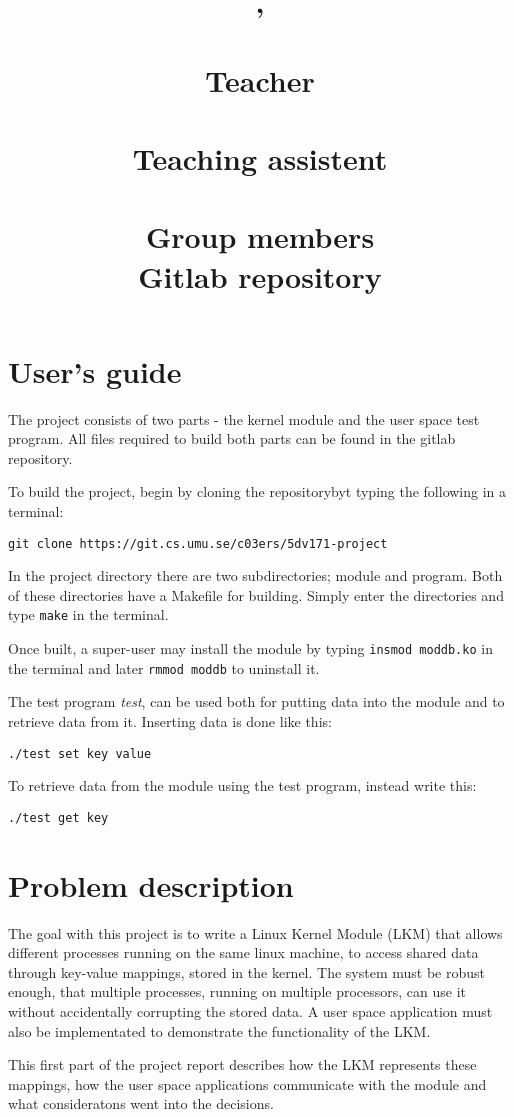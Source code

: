 \documentclass[draft,a4paper]{article}
\title{
  \vspace{4em}
  \pagenumbering{gobble}
  \begin{center}
  {\LARGE \bf \course{}, \semester}\\
  {\Large \bf \assignment}\\
  \vspace{6em}
  {\normalsize
  {\bf Teacher}\\
  {\lecturer}\vspace{1em}\\
  {\bf Teaching assistent}\\
  {\assistants}\vspace{1em}\\
  {\bf Group members}\\
  \authors
  {\bf Gitlab repository}\vspace{-1em}\\
  {\codebase}}
  \end{center}
}
\author{}
\date{}
\newcommand{\codebase}{https://git.cs.umu.se/c03ers/5dv171-project}
\begin{document}
\maketitle
\pagebreak
{}

\section*{User's guide}
The project consists of two parts - the kernel module and the user space
test program. All files required to build both parts can be found in the gitlab
repository.

To build the project, begin by cloning the repositorybyt typing the following in
a terminal:
\begin{center}
{\tt git clone \codebase}
\end{center}
In the project directory there are two subdirectories; module and program.
Both of these directories have a Makefile for building. Simply enter the
directories and type {\tt make} in the terminal.

Once built, a super-user may install the module by typing 
{\tt insmod moddb.ko} in the terminal and later {\tt rmmod moddb}
to uninstall it.

The test program \emph{test}, can be used both for putting data
into the module and to retrieve data from it. Inserting data is done like this:
\begin{center}
{\tt ./test set key value}
\end{center}
To retrieve data from the module using the test program, instead write this:
\begin{center}
{\tt ./test get key}
\end{center}

\section*{Problem description}
The goal with this project is to write a Linux Kernel Module (LKM) that allows
different processes running on the same linux machine, to access shared data
through key-value mappings, stored in the kernel. The system must be robust
enough, that multiple processes, running on multiple processors, can use it
without accidentally corrupting the stored data. A user space application must
also be implementated to demonstrate the functionality of the LKM.

This first part of the project report describes how the LKM represents these
mappings, how the user space applications communicate with the module and
what consideratons went into the decisions.\pagebreak
\end{document}
